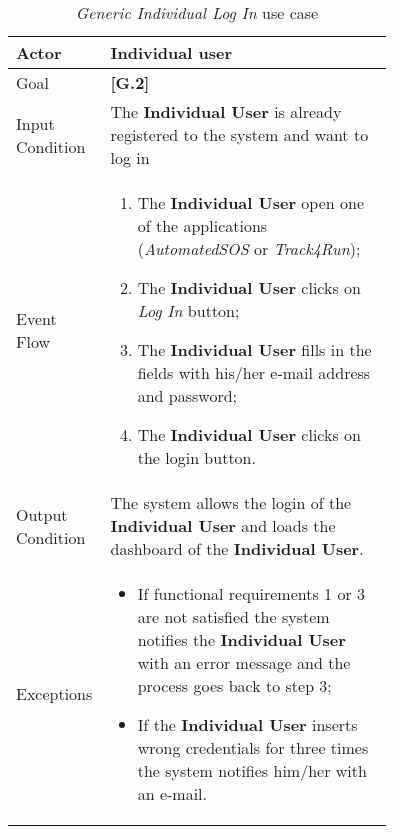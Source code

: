 \begin{center}
\begin{table}
\begin{tabular}{ | l | p{0.75\linewidth} | }
  \hline
    Actor & \textbf{Individual user} \\ \hline
    Goal & \textbf{[G.2]} \\ \hline
    Input Condition & The \textbf{Individual User} is already registered to the system and want to log in \\ \hline
    Event Flow & \begin{minipage}[t]{0.7\textwidth}
      \begin{enumerate}
        \item The \textbf{Individual User} open one of the applications (\textit{AutomatedSOS} or \textit{Track4Run});
        \item The \textbf{Individual User} clicks on \textit{Log In} button;
        \item The \textbf{Individual User} fills in the fields with his/her e-mail address and password;
        \item The \textbf{Individual User} clicks on the login button.
      \end{enumerate}
    \smallskip
  \end{minipage} \\ \hline
  Output Condition & The system allows the login of the \textbf{Individual User} and loads the dashboard of the \textbf{Individual User}. \\ \hline
  Exceptions & \begin{minipage}[t]{0.7\textwidth}
    \begin{itemize}
      \smallskip
      \item If functional requirements 1 or 3 are not satisfied the system notifies the \textbf{Individual User} with an error message and the process goes back to step 3;
      \item If the \textbf{Individual User} inserts wrong credentials for three times the system notifies him/her with an e-mail.
    \end{itemize}
    \smallskip
  \end{minipage}  \\ \hline
\end{tabular}
\caption{\textit{Generic Individual Log In} use case}
\label{table:genericIndividualLogInInTable}
\end{table}
\end{center}

